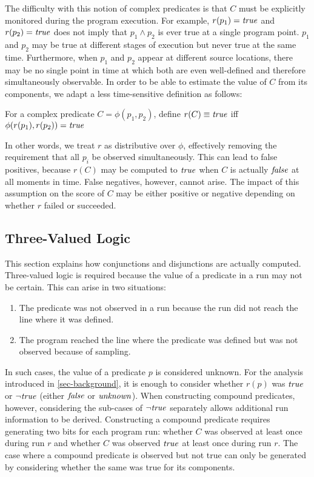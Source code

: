 The difficulty with this notion of complex predicates is that $C$ must be explicitly monitored during the program execution.  For example, $r(p_1) = \mathit{true}$ and $r(p_2) = \mathit{true}$ does not imply that $p_1 \wedge p_2$ is ever true at a single program point.  $p_1$ and $p_2$ may be true at different stages of execution but never true at the same time.  Furthermore, when $p_1$ and $p_2$ appear at different source locations, there may be no single point in time at which both are even well-defined and therefore simultaneously observable.  In order to be able to estimate the value of $C$ from its components, we adapt a less time-sensitive definition as follows:
\begin{defn}
\label{dfn2}
For a complex predicate $C = \phi(p_1, p_2)$, define $r(C) \equiv \mathit{true}$ iff $\phi(r(p_1), r(p_2)) = \mathit{true}$
\end{defn}

In other words, we treat $r$ as distributive over $\phi$, effectively removing the requirement that all $p_i$ be observed simultaneously.  This can lead to false positives, because $r(C)$ may be computed to $\mathit{true}$ when $C$ is actually $\mathit{false}$ at all moments in time.  False negatives, however, cannot arise.  The impact of this assumption on the score of $C$ may be either positive or negative depending on whether $r$ failed or succeeded.

\subsection{Three-Valued Logic}
\label{sec-tvl}
This section explains how conjunctions and disjunctions are actually computed.  Three-valued logic is required because the value of a predicate in a run may not be certain. This can arise in two situations:
\begin{enumerate}
\item The predicate was not observed in a run because the run did not reach the line where it was defined.
\item The program reached the line where the predicate was defined but was not observed because of sampling.
\end{enumerate}


In such cases, the value of a predicate $p$ is considered unknown.  For the 
analysis introduced in \autoref{sec-background}, it is enough to consider whether 
$r(p)$ was $\mathit{true}$ or $\neg \mathit{true}$ (either $\mathit{false}$ or $\mathit{unknown}$).  When 
constructing compound predicates, however, considering the sub-cases of 
$\neg \mathit{true}$ separately allows additional run information to be derived.  
Constructing a compound predicate requires generating two bits for each program
run: whether $C$ was observed at least once during run $r$ and whether $C$ was
observed $\mathit{true}$ at least once during run $r$.  The case where a compound 
predicate is observed but not true can only be generated by considering whether 
the same was true for its components.

